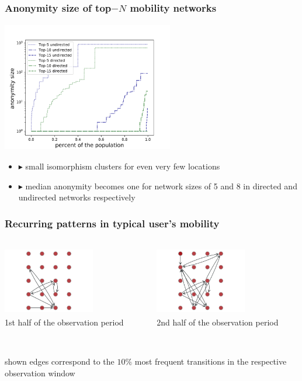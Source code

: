 \documentclass[hyperref={colorlinks = true},unknownkeysallowed]{beamer}
\begin{document}
\begin{frame}
	\frametitle{Anonymity size of  top$-N$ mobility networks}
	\vspace{.15cm}
	\begin{center}
			\includegraphics[width=7.5cm, height=5.7cm]{figs/anonymity_distribution_.pdf}
	\end{center}
	\begin{itemize}
		\item  $\blacktriangleright$ small isomorphism clusters for even very few locations
		\item  $\blacktriangleright$ median anonymity becomes one for network
sizes of 5 and 8 in directed and undirected networks
respectively
\end{itemize}
\end{frame}

\begin{frame}
	\frametitle{{\Fontit Recurring patterns in typical user's  mobility}}
	\begin{center}
	\begin{columns}
		\begin{column}[t]{0.49\textwidth}
				\centering \includegraphics[width=4cm, height=3cm]{figs/2_firsthalf_.pdf}
				\\1st half of the observation period
		\end{column}
			\begin{column}[t]{0.49\textwidth}
				\centering \includegraphics[width=4cm, height=3cm]{figs/2_secondhalf_.pdf}
				\\2nd half of the observation period 
	\end{column}
	\end{columns}
	\end{center}
\\
		 \footnotesize{shown edges correspond to the $10\%$ most frequent transitions in the respective observation window}
\end{frame}
\end{document}
